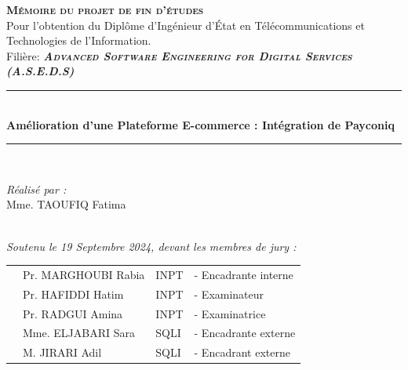 \vspace{0.4cm}
\begin{center}
{\large \textsc{\textbf{Mémoire du projet de fin d'études}}}\\[0.1cm]
{\large {Pour l’obtention du Diplôme d’Ingénieur d’État en Télécommunications 
et Technologies de l’Information.}}\\[0.1cm]
{\large Filière:\textsc{\textit{\textbf{ Advanced Software Engineering for Digital Services (A.S.E.D.S)}}}} \\[0.05cm] 
\vspace{0.4cm}
\vspace{-0.04cm}
\rule{\linewidth}{0.3mm} \\[0.3cm]   %
 { \huge \textbf{Amélioration d'une Plateforme E-commerce : Intégration de Payconiq}} \\[0.15cm] 
\rule{\linewidth}{0.3mm} \\[0.3cm]



\vspace{0.8cm}

\noindent
\begin{minipage}{0.9\textwidth}
    \vspace{-7mm}
  \begin{flushleft} \large
    \emph{Réalisé par :}\\
    Mme. TAOUFIQ Fatima %
  \end{flushleft}
\end{minipage}
\begin{minipage}{0.4\textwidth}

\end{minipage}\\[0.3cm]

{\large \textit{Soutenu le 19 Septembre 2024, devant les membres de jury : }}\\[0.3cm]


\begin{tabular}{p{1cm}lll}
  & \large Pr. MARGHOUBI Rabia & \large INPT & \large - Encadrante interne  \\[0.1cm]
  & \large Pr. HAFIDDI Hatim & \large INPT & \large - Examinateur \\[0.1cm]
  & \large Pr. RADGUI Amina & \large INPT & \large - Examinatrice  \\[0.1cm]
  & \large Mme. ELJABARI Sara & \large SQLI & \large - Encadrante externe  \\[0.1cm]
  & \large M. JIRARI Adil & \large SQLI & \large - Encadrant externe  \\[0.1cm]



\end{tabular}
\end{center}
